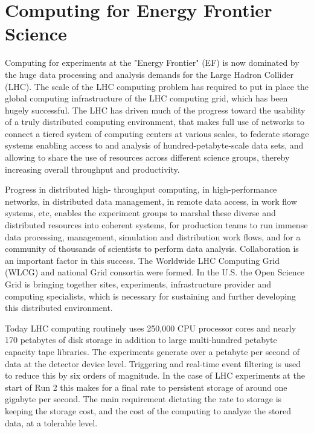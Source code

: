 
\section{Computing for Energy Frontier Science}

Computing for experiments at the "Energy Frontier" (EF) is now dominated by the huge data
processing and analysis demands for the Large Hadron Collider (LHC). The scale
of the LHC computing problem has required to put in place the global computing
infrastructure of the LHC computing grid, which has been hugely successful. 
The LHC
has driven much of the progress toward the usability of a truly distributed
computing environment, that makes full use of networks to connect a tiered
system of computing centers at various scales, to federate storage systems
enabling access to and analysis of hundred-petabyte-scale data sets, and
allowing to share the use of resources across different science groups, thereby
increasing overall throughput and productivity. 

Progress in distributed high- throughput computing, in high-performance
networks, in distributed data management, in remote data access, in work flow
systems, etc, enables the experiment groups to marshal these diverse
and distributed resources into coherent systems, for production teams to run
immense data processing, management, simulation and distribution work flows,
and for a community of thousands of scientists to perform data analysis.
Collaboration is an important factor in this success. The Worldwide LHC
Computing Grid (WLCG)  and national Grid consortia were formed. In the U.S.
the Open Science Grid is  bringing together sites, experiments, infrastructure
provider and computing specialists, which is necessary for 
sustaining and further developing this distributed environment.

Today LHC computing routinely uses 250,000 CPU processor cores and nearly 170
petabytes of disk storage in addition to large multi-hundred petabyte capacity
tape libraries.  The experiments generate over a petabyte per second of data
at the detector device level. Triggering and real-time event filtering  is
used to reduce this by six orders of magnitude. In the case of LHC experiments
at the start of Run 2 this makes for a final rate to persistent storage of
around one gigabyte per second. The main requirement dictating the rate to
storage is keeping the storage cost, and the  cost of the computing to analyze
the stored data, at a tolerable level.

